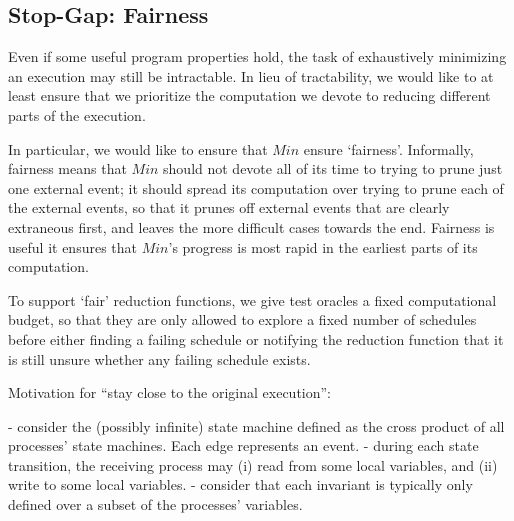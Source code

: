  

\subsection{Stop-Gap: Fairness}

Even if some useful program properties hold, the task of exhaustively
minimizing an execution may still be intractable. In lieu of tractability, we
would like to at least ensure that we prioritize the computation we devote to
reducing different parts of the execution.

In particular, we would like to ensure that $Min$ ensure `fairness'. Informally,
fairness means that
$Min$ should not devote all of its time to trying to prune just one
external event; it should spread its computation over trying to prune each
of the external events, so that it prunes off external events that are clearly
extraneous first, and leaves the more difficult cases towards the end.
Fairness is useful it ensures that $Min$'s progress is most rapid in the
earliest parts of its computation.

To support `fair' reduction functions, we give test oracles a fixed
computational budget, so that they are only allowed to explore a fixed
number of schedules before either finding a failing schedule or notifying the
reduction function that it is still unsure whether any failing schedule
exists.



Motivation for “stay close to the original execution”:

- consider the (possibly infinite) state machine defined as the cross product of all processes' state machines. Each edge represents an event.
- during each state transition, the receiving process may (i) read from some local variables, and (ii) write to some local variables.
- consider that each invariant is typically only defined over a subset of the processes' variables.



